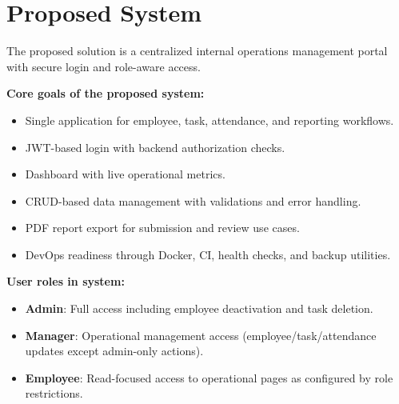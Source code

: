 ﻿\chapter{Proposed System}

The proposed solution is a centralized internal operations management portal with secure login and role-aware access.

\textbf{Core goals of the proposed system:}
\begin{itemize}[leftmargin=1.3cm]
\item Single application for employee, task, attendance, and reporting workflows.
\item JWT-based login with backend authorization checks.
\item Dashboard with live operational metrics.
\item CRUD-based data management with validations and error handling.
\item PDF report export for submission and review use cases.
\item DevOps readiness through Docker, CI, health checks, and backup utilities.
\end{itemize}

\textbf{User roles in system:}
\begin{itemize}[leftmargin=1.3cm]
\item \textbf{Admin}: Full access including employee deactivation and task deletion.
\item \textbf{Manager}: Operational management access (employee/task/attendance updates except admin-only actions).
\item \textbf{Employee}: Read-focused access to operational pages as configured by role restrictions.
\end{itemize}
